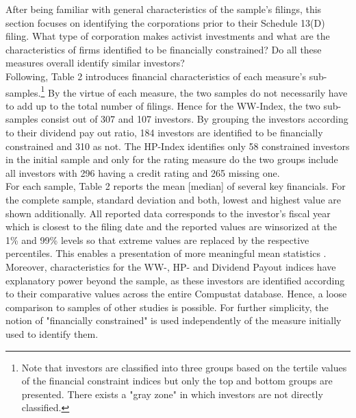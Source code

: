 \documentclass[12pt]{article}
\begin{document}
After being familiar with general characteristics of the sample's filings, this section focuses on identifying the corporations prior to their Schedule 13(D) filing. What type of corporation makes activist investments and what are the characteristics of firms identified to be financially constrained? Do all these measures overall identify similar investors?\\
Following, Table 2 introduces financial characteristics of each measure's sub-samples.\footnote{Note that investors are classified into three groups based on the tertile values of the financial constraint indices but only the top and bottom groups are presented. There exists a "gray zone" in which investors are not directly classified.} By the virtue of each measure, the two samples do not necessarily have to add up to the total number of filings. Hence for the WW-Index, the two sub-samples consist out of 307 and 107 investors. By grouping the investors according to their dividend pay out ratio, 184 investors are identified to be financially constrained and 310 as not. The HP-Index identifies only 58 constrained investors in the initial sample and only for the rating measure do the two groups include all investors with 296 having a credit rating and 265 missing one.\\
For each sample, Table 2 reports the mean [median] of several key financials. For the complete sample, standard deviation and both, lowest and highest value are shown additionally. All reported data corresponds to the investor's fiscal year which is closest to the filing date and the reported values are winsorized at the 1\% and 99\% levels so that extreme values are replaced by the respective percentiles. This enables a presentation of more meaningful mean statistics \citep[p.203]{Klein2009}. Moreover, characteristics for the WW-, HP- and Dividend Payout indices have explanatory power beyond the sample, as these investors are identified according to their comparative values across the entire Compustat database. Hence, a loose comparison to samples of other studies is possible. For further simplicity, the notion of "financially constrained" is used independently of the measure initially used to identify them. \\
\end{document}
